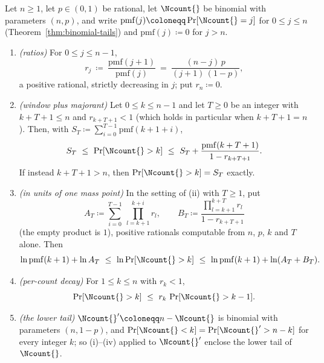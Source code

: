 \begin{lemma}\label{lem:tail-majorant}
Let $n\ge1$, let $p\in(0,1)$ be rational, let $\Ncount{}$ be binomial with
parameters $(n,p)$, and write $\mathrm{pmf}(j)\coloneqq\Pr[\Ncount{}=j]$ for
$0\le j\le n$ (Theorem~\ref{thm:binomial-tails}) and $\mathrm{pmf}(j)\coloneqq0$ for
$j>n$.
\begin{enumerate}[label=(\roman*),leftmargin=2.2em]
\item \emph{(ratios)} For $0\le j\le n-1$,
\begin{equation}\label{eq:pmf-ratio}
  r_j\ \coloneqq\ \frac{\mathrm{pmf}(j+1)}{\mathrm{pmf}(j)}
  \ =\ \frac{(n-j)\,p}{(j+1)\,(1-p)},
\end{equation}
a positive rational, strictly decreasing in $j$; put $r_n\coloneqq0$.
\item \emph{(window plus majorant)} Let $0\le k\le n-1$ and let $T\ge0$ be
an integer with $k+T+1\le n$ and $r_{k+T+1}<1$ (which holds in particular
when $k+T+1=n$). Then, with $S_T\coloneqq\sum_{i=0}^{T-1}\mathrm{pmf}(k+1+i)$,
\begin{equation}\label{eq:tail-window}
  S_T\ \le\ \Pr[\Ncount{}>k]\ \le\
  S_T+\frac{\mathrm{pmf}(k+T+1)}{1-r_{k+T+1}} .
\end{equation}
If instead $k+T+1>n$, then $\Pr[\Ncount{}>k]=S_T$ exactly.
\item \emph{(in units of one mass point)} In the setting of (ii) with
$T\ge1$, put
\begin{equation}\label{eq:window-rationals}
  A_T\coloneqq\sum_{i=0}^{T-1}\ \prod_{l=k+1}^{k+i}r_l,
  \qquad
  B_T\coloneqq\frac{\prod_{l=k+1}^{k+T}r_l}{1-r_{k+T+1}}
\end{equation}
(the empty product is $1$), positive rationals computable from $n$, $p$, $k$
and $T$ alone. Then
\begin{equation}\label{eq:tail-log}
  \ln\mathrm{pmf}(k+1)+\ln A_T
  \ \le\ \ln\Pr[\Ncount{}>k]\ \le\
  \ln\mathrm{pmf}(k+1)+\ln(A_T+B_T).
\end{equation}
\item \emph{(per-count decay)} For $1\le k\le n$ with $r_k<1$,
\begin{equation}\label{eq:tail-decay}
  \Pr[\Ncount{}>k]\ \le\ r_k\,\Pr[\Ncount{}>k-1].
\end{equation}
\item \emph{(the lower tail)} $\Ncount{}'\coloneqq n-\Ncount{}$ is binomial
with parameters $(n,1-p)$, and $\Pr[\Ncount{}<k]=\Pr[\Ncount{}'>n-k]$ for
every integer $k$; so (i)--(iv) applied to $\Ncount{}'$ enclose the lower
tail of $\Ncount{}$.
\end{enumerate}
\end{lemma}

